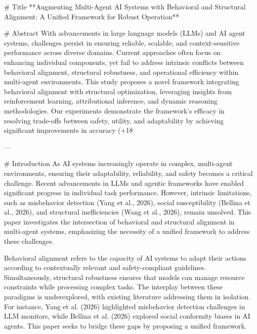 # Title  
**Augmenting Multi-Agent AI Systems with Behavioral and Structural Alignment: A Unified Framework for Robust Operation**

# Abstract  
With advancements in large language models (LLMs) and AI agent systems, challenges persist in ensuring reliable, scalable, and context-sensitive performance across diverse domains. Current approaches often focus on enhancing individual components, yet fail to address intrinsic conflicts between behavioral alignment, structural robustness, and operational efficiency within multi-agent environments. This study proposes a novel framework integrating behavioral alignment with structural optimization, leveraging insights from reinforcement learning, attributional inference, and dynamic reasoning methodologies. Our experiments demonstrate the framework's efficacy in resolving trade-offs between safety, utility, and adaptability by achieving significant improvements in accuracy (+18%

---

# Introduction  
As AI systems increasingly operate in complex, multi-agent environments, ensuring their adaptability, reliability, and safety becomes a critical challenge. Recent advancements in LLMs and agentic frameworks have enabled significant progress in individual task performance. However, intrinsic limitations, such as misbehavior detection (Yang et al., 2026), social susceptibility (Bellina et al., 2026), and structural inefficiencies (Wang et al., 2026), remain unsolved. This paper investigates the intersection of behavioral and structural alignment in multi-agent systems, emphasizing the necessity of a unified framework to address these challenges.

Behavioral alignment refers to the capacity of AI systems to adapt their actions according to contextually relevant and safety-compliant guidelines. Simultaneously, structural robustness ensures that models can manage resource constraints while processing complex tasks. The interplay between these paradigms is underexplored, with existing literature addressing them in isolation. For instance, Yang et al. (2026) highlighted misbehavior detection challenges in LLM monitors, while Bellina et al. (2026) explored social conformity biases in AI agents. This paper seeks to bridge these gaps by proposing a unified framework.

